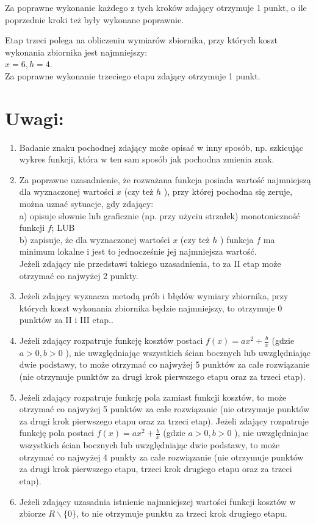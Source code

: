 \documentclass[10pt]{article}
\begin{document}
Za poprawne wykonanie każdego z tych kroków zdający otrzymuje 1 punkt, o ile poprzednie kroki też były wykonane poprawnie.

Etap trzeci polega na obliczeniu wymiarów zbiornika, przy których koszt wykonania zbiornika jest najmniejszy:\\
$x=6, h=4$.\\
Za poprawne wykonanie trzeciego etapu zdający otrzymuje 1 punkt.

\section*{Uwagi:}
\begin{enumerate}
  \item Badanie znaku pochodnej zdający może opisać w inny sposób, np. szkicując wykres funkcji, która w ten sam sposób jak pochodna zmienia znak.
  \item Za poprawne uzasadnienie, że rozważana funkcja posiada wartość najmniejszą dla wyznaczonej wartości $x$ (czy też $h$ ), przy której pochodna się zeruje, można uznać sytuacje, gdy zdający:\\
a) opisuje słownie lub graficznie (np. przy użyciu strzałek) monotoniczność funkcji $f$; LUB\\
b) zapisuje, że dla wyznaczonej wartości $x$ (czy też $h$ ) funkcja $f$ ma minimum lokalne i jest to jednocześnie jej najmniejsza wartość.\\
Jeżeli zdający nie przedstawi takiego uzasadnienia, to za II etap może otrzymać co najwyżej 2 punkty.
  \item Jeżeli zdający wyznacza metodą prób i błędów wymiary zbiornika, przy których koszt wykonania zbiornika będzie najmniejszy, to otrzymuje 0 punktów za II i III etap..
  \item Jeżeli zdający rozpatruje funkcję kosztów postaci $f(x)=a x^{2}+\frac{b}{x}$ (gdzie $a>0, b>0$ ), nie uwzględniając wszystkich ścian bocznych lub uwzględniając dwie podstawy, to może otrzymać co najwyżej 5 punktów za całe rozwiązanie (nie otrzymuje punktów za drugi krok pierwszego etapu oraz za trzeci etap).
  \item Jeżeli zdający rozpatruje funkcję pola zamiast funkcji kosztów, to może otrzymać co najwyżej 5 punktów za całe rozwiązanie (nie otrzymuje punktów za drugi krok pierwszego etapu oraz za trzeci etap). Jeżeli zdający rozpatruje funkcję pola postaci $f(x)=a x^{2}+\frac{b}{x}$ (gdzie $a>0, b>0$ ), nie uwzględniajac wszystkich ścian bocznych lub uwzględniając dwie podstawy, to może otrzymać co najwyżej 4 punkty za całe rozwiązanie (nie otrzymuje punktów za drugi krok pierwszego etapu, trzeci krok drugiego etapu oraz za trzeci etap).
  \item Jeżeli zdający uzasadnia istnienie najmniejszej wartości funkcji kosztów w zbiorze $R \backslash\{0\}$, to nie otrzymuje punktu za trzeci krok drugiego etapu.
\end{enumerate}
\end{document}
